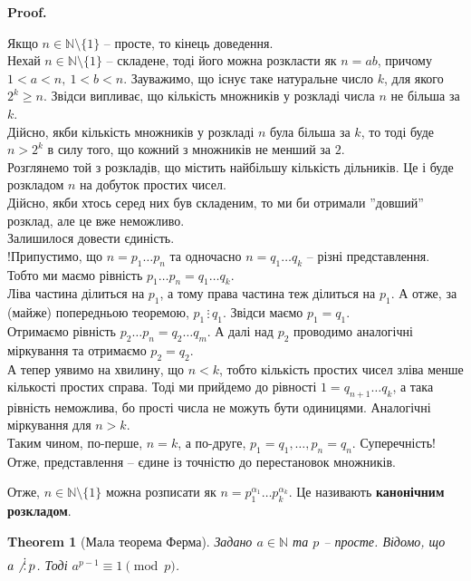 \documentclass[a4paper, 10pt]{article}
\makeatletter
\def\qed{$\blacksquare$}
\theoremstyle{theoremdd}
\newtheorem{theorem}{Theorem}[subsection]
\theoremstyle{theoremdd}
\theoremstyle{theoremdd}
\theoremstyle{theoremdd}
\theoremstyle{theoremdd}
\theoremstyle{theoremdd}
\theoremstyle{theoremdd}
\theoremstyle{theoremdd}
\renewenvironment{proof}[1][Proof.\\]{\par
\pushQED{\hfill \qed}%
\normalfont \topsep6\p@\@plus6\p@\relax
\trivlist
\item\relax
{\bfseries
#1\@addpunct{.}}\hspace\labelsep\ignorespaces
}{%
\popQED\endtrivlist\@endpefalse
}
\newcommand\divisibleBy{\, \vdots \,}
\makeatother
\begin{document}
\begin{proof}
Якщо $n \in \mathbb{N} \setminus \{1\}$ -- просте, то кінець доведення.\\
Нехай $n \in \mathbb{N} \setminus \{1\}$ -- складене, тоді його можна розкласти як $n = ab$, причому $1 < a < n,\ 1 < b < n$. Зауважимо, що існує таке натуральне число $k$, для якого $2^k \geq n$. Звідси випливає, що кількість множників у розкладі числа $n$ не більша за $k$.\\
Дійсно, якби кількість множників у розкладі $n$ була більша за $k$, то тоді буде $n > 2^k$ в силу того, що кожний з множників не менший за $2$.\\
Розглянемо той з розкладів, що містить найбільшу кількість дільників. Це і буде розкладом $n$ на добуток простих чисел.\\
Дійсно, якби хтось серед них був складеним, то ми би отримали ''довший'' розклад, але це вже неможливо.
\bigskip \\
Залишилося довести єдиність. \\
!Припустимо, що $n = p_1\dots p_n$ та одночасно $n = q_1 \dots q_k$ -- різні представлення. Тобто ми маємо рівність $p_1 \dots p_n = q_1 \dots q_k$.\\
Ліва частина ділиться на $p_1$, а тому права частина теж ділиться на $p_1$. А отже, за (майже) попередньою теоремою, $p_1 \divisibleBy q_1$. Звідси маємо $p_1 = q_1$.\\
Отримаємо рівність $p_2 \dots p_n = q_2 \dots q_m$. А далі над $p_2$ проводимо аналогічні міркування та отримаємо $p_2 = q_2$.\\
А тепер уявимо на хвилину, що $n < k$, тобто кількість простих чисел зліва менше кількості простих справа. Тоді ми прийдемо до рівності $1 = q_{n+1} \dots q_k$, а така рівність неможлива, бо прості числа не можуть бути одиницями. Аналогічні міркування для $n > k$.\\
Таким чином, по-перше, $n=k$, а по-друге, $p_1 = q_1,\dots,p_n = q_n$. Суперечність!\\
Отже, представлення -- єдине із точністю до перестановок множників.
\end{proof}

Отже, $n \in \mathbb{N} \setminus \{1\}$ можна розписати як $n = p_1^{\alpha_1} \dots p_k^{\alpha_k}$. Це називають \textbf{канонічним розкладом}.

\begin{theorem}[Мала теорема Ферма]
Задано $a \in \mathbb{N}$ та $p$ -- просте. Відомо, що $a \not\divisibleBy p$. Тоді $a^{p-1} \equiv 1 \pmod p$.
\end{theorem}
\end{document}
